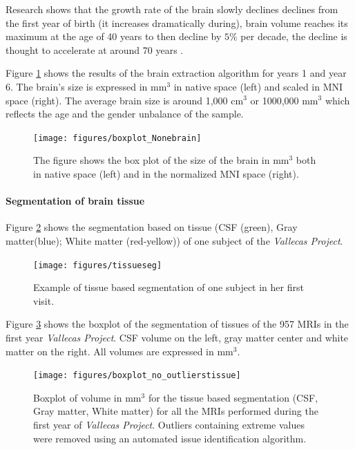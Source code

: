 \documentclass[11pt]{article}
\theoremstyle{definition}
\theoremstyle{remark}
\begin{document}
Research shows that the growth rate of the brain slowly declines declines from the first year of birth (it increases dramatically during), brain volume reaches its maximum at the age of 40 years to then decline by $5\%$ per decade, the decline is thought to accelerate at around 70 years \cite{peters2006ageing}.

Figure \ref{fig:boxbet} shows the results of the brain extraction algorithm for years 1 and year 6. The brain's size is expressed in mm${^3}$ in native space (left) and scaled in MNI space (right). 
The average brain size is around 1,000 cm${^3}$ or 1000,000 mm${^3}$ which reflects the age and the gender unbalance of the sample.

\begin{figure}[H]
        \centering
        \texttt{[image: figures/boxplot\_Nonebrain]}
        \caption{The figure shows the box plot of the size of the brain in mm${^3}$ both in native space (left) and in the normalized MNI space (right).} 
        \label{fig:boxbet}
\end{figure}




\paragraph*{Segmentation of brain tissue}
Figure \ref{fig:tissueseg} shows the segmentation based on tissue (CSF (green), Gray matter(blue); White matter (red-yellow)) of one subject of the \emph{Vallecas Project}.

\begin{figure}[H]
        \centering
        \texttt{[image: figures/tissueseg]}
        \caption{Example of tissue based segmentation of one subject in her first visit. } 
        \label{fig:tissueseg}
\end{figure}

Figure \ref{fig:boxtissue} shows the boxplot of the segmentation of tissues of the 957 MRIs in the first year \emph{Vallecas Project}. CSF volume on the left, gray matter center and white matter on the right. All volumes are expressed in mm${^3}$.


\begin{figure}[H]
        \centering
        \texttt{[image: figures/boxplot\_no\_outlierstissue]}
        \caption{Boxplot of volume in mm${^3}$ for the tissue based segmentation (CSF, Gray matter, White matter) for all the MRIs performed during the first year of \emph{Vallecas Project}. Outliers containing extreme values were removed using an automated issue identification algorithm.} 
        \label{fig:boxtissue}
\end{figure}
\end{document}
